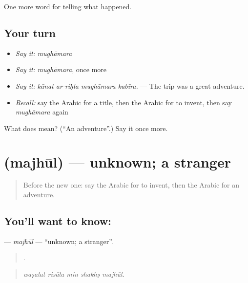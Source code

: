 \begin{grammarlens}[title={What you've built}]
One more word for telling what happened.
\end{grammarlens}

\subsection*{Your turn}
\begin{itemize}
\raggedright
  \item \emph{Say it:} \emph{mughāmara}
  \item \emph{Say it:} \emph{mughāmara}, once more
  \item \emph{Say it:} \emph{kānat ar-riḥla mughāmara kabīra.} — The trip was a great adventure.
  \item \emph{Recall:} say the Arabic for a title, then the Arabic for to invent, then say \emph{mughāmara} again
\end{itemize}

\begin{tcolorbox}[breakable,colback=teal!4,colframe=teal!35!black,title={Before you move on}]
What does  mean? (\textquotedblleft{}An adventure\textquotedblright{}.) Say it once more.
\end{tcolorbox}
\section[\texorpdfstring{\ar{مجهول} (majhūl)}{مجهول (majhūl)}]{ (majhūl) — unknown; a stranger}

\label{lesson:AR-C343-majhul}



\begin{quote}
Before the new one: say the Arabic for to invent, then the Arabic for an adventure.
\end{quote}

\subsection*{You'll want to know: }
\textbf{} — \emph{majhūl} — \textquotedblleft{}unknown; a stranger\textquotedblright{}.

\begin{quote}
    .
\end{quote}

\begin{quote}
\emph{waṣalat risāla min shakhṣ majhūl.}
\end{quote}

